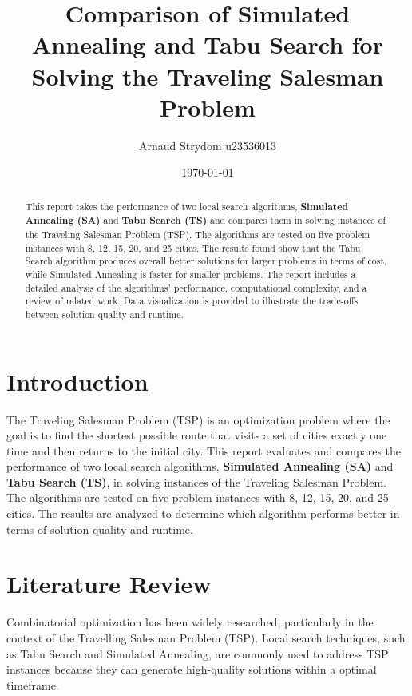 \documentclass{article}
\title{Comparison of Simulated Annealing and Tabu Search for Solving the Traveling Salesman Problem}
\author{Arnaud Strydom u23536013}
\date{\today}
\begin{document}
\maketitle

\begin{abstract}
This report takes the performance of two local search algorithms, \textbf{Simulated Annealing (SA)} and \textbf{Tabu Search (TS)} and compares them in solving instances of the Traveling Salesman Problem (TSP). The algorithms are tested on five problem instances with 8, 12, 15, 20, and 25 cities. The results found show that the Tabu Search algorithm produces overall better solutions for larger problems in terms of cost, while Simulated Annealing is faster for smaller problems. The report includes a detailed analysis of the algorithms' performance, computational complexity, and a review of related work. Data visualization is provided to illustrate the trade-offs between solution quality and runtime.
\end{abstract}

\section{Introduction}
The Traveling Salesman Problem (TSP) is an optimization problem where the goal is to find the shortest possible route that visits a set of cities exactly one time and then returns to the initial city. This report evaluates and compares the performance of two local search algorithms, \textbf{Simulated Annealing (SA)} and \textbf{Tabu Search (TS)}, in solving instances of the Traveling Salesman Problem. The algorithms are tested on five problem instances with 8, 12, 15, 20, and 25 cities. The results are analyzed to determine which algorithm performs better in terms of solution quality and runtime.

\section{Literature Review}
Combinatorial optimization has been widely researched, particularly in the context of the Travelling Salesman Problem (TSP). Local search techniques, such as Tabu Search and Simulated Annealing, are commonly used to address TSP instances because they can generate high-quality solutions within a optimal timeframe.
\end{document}
